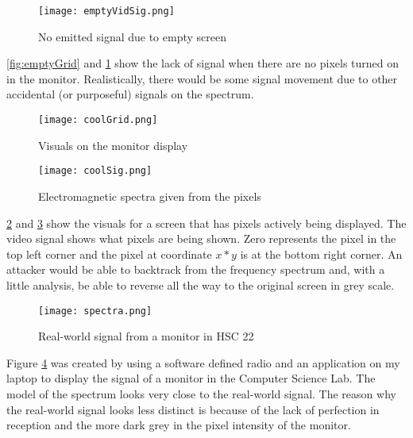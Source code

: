 \documentclass{article}
\begin{document}
\newpage
\begin{figure}[h]
\centering
\texttt{[image: emptyVidSig.png]}
\caption{\label{fig:emptyVidSig} No emitted signal due to empty screen}
\end{figure}

\ref{fig:emptyGrid} and \ref{fig:emptyVidSig} show the lack of signal when there are no pixels turned on in the monitor. Realistically, there would be some signal movement due to other accidental (or purposeful) signals on the spectrum.

\begin{figure}[H]
\centering
\texttt{[image: coolGrid.png]}
\caption{\label{fig:coolGrid} Visuals on the monitor display}
\end{figure}
\begin{figure}[H]
\centering
\texttt{[image: coolSig.png]}
\caption{\label{fig:coolVidSig} Electromagnetic spectra given from the pixels}
\end{figure}
\ref{fig:coolGrid} and \ref{fig:coolVidSig} show the visuals for a screen that has pixels actively being displayed. The video signal shows what pixels are being shown. Zero represents the pixel in the top left corner and the pixel at coordinate $x*y$ is at the bottom right corner. An attacker would be able to backtrack from the frequency spectrum and, with a little analysis, be able to reverse all the way to the original screen in grey scale. 
\begin{figure}[H]
\centering
\texttt{[image: spectra.png]}
\caption{\label{fig:spec} Real-world signal from a monitor in HSC 22}
\end{figure}
Figure \ref{fig:spec} was created by using a software defined radio and an application on my laptop to display the signal of a monitor in the Computer Science Lab. The model of the spectrum looks very close to the real-world signal. The reason why the real-world signal looks less distinct is because of the lack of perfection in reception and the more dark grey in the pixel intensity of the monitor. 
\end{document}
